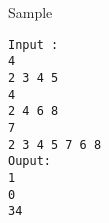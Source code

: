 Sample
\begin{verbatim}
Input :
4  
2 3 4 5 
4 
2 4 6 8 
7 
2 3 4 5 7 6 8 
Ouput: 
1 
0 
34 
\end{verbatim}